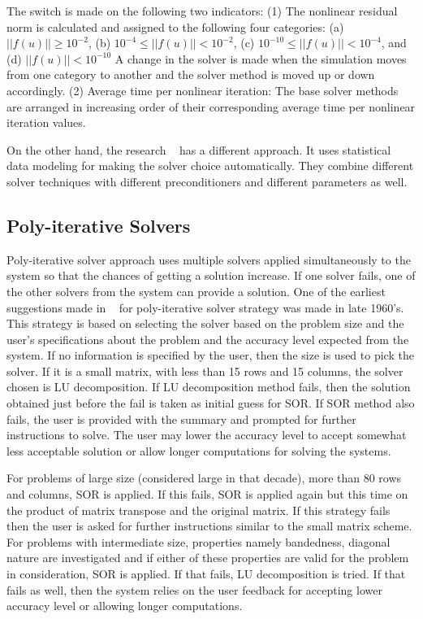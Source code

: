 The switch is made on the following two indicators: 
(1) The nonlinear residual norm is calculated and assigned to the following four categories: 
(a) $||f(u)|| \geq 10^{-2}$, (b) $10^{-4} \leq ||f(u)|| < 10^{-2}$, (c)
$10^{-10} \leq ||f(u)|| < 10^{-4} $, and (d) $||f(u)|| < 10^{-10}$
A change in the solver is made when the simulation moves from one category to another and the solver method is moved up or down accordingly. 
(2) Average time per nonlinear iteration:
The base solver methods are arranged in increasing order of their corresponding average time per nonlinear iteration values.

On the other hand, the research ~\cite{adaptive2} has a different approach. It uses statistical data modeling for making the solver choice automatically. They combine different solver techniques with different preconditioners and different parameters as well.

\subsection{Poly-iterative Solvers}
Poly-iterative solver approach uses multiple solvers applied simultaneously to the system so that the chances of getting a solution increase. If one solver fails, one of the other solvers from the system can provide a solution. One of the earliest suggestions made in ~\cite{earliest1} for poly-iterative solver strategy was made in late 1960's. This strategy is based on selecting the solver based on the problem size and the user's specifications about the problem and the accuracy level expected from the system. If no information is specified by the user, then the size is used to pick the solver. If it is a small matrix, with less than 15 rows and 15 columns, the solver chosen is LU decomposition. If LU decomposition method fails, then the solution obtained just before the fail is taken as initial guess for SOR. If SOR method also fails, the user is provided with the summary and prompted for further instructions to solve. The user may lower the accuracy level to accept somewhat less acceptable solution or allow longer computations for solving the systems. 

For problems of large size (considered large in that decade), more than 80 rows and columns, SOR is applied. If this fails, SOR is applied again but this time on the product of matrix transpose and the original matrix. If this strategy fails then the user is asked for further instructions similar to the small matrix scheme. For problems with intermediate size, properties namely bandedness, diagonal nature are investigated and if either of these properties are valid for the problem in consideration, SOR is applied. If that fails, LU decomposition is tried. If that fails as well, then the system relies on the user feedback for accepting lower accuracy level or allowing longer computations.

